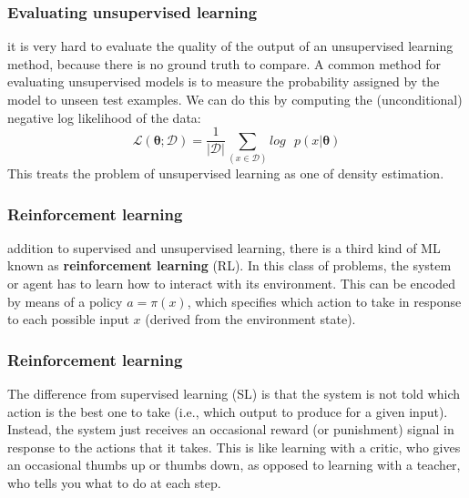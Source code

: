 \documentclass[spanish]{beamer}
\begin{document}
\begin{frame}
\frametitle{Evaluating unsupervised learning}
it is very hard to evaluate the quality of the output of
an unsupervised learning method, because there is no ground truth to compare. A common method for evaluating unsupervised models is to measure the probability assigned by the model to unseen test examples. We can do this by computing the (unconditional) negative log likelihood of the data: 
\begin{equation*}
\mathcal{L}(\mathbf{\theta}; \mathcal{D})= \frac{1}{\vert \mathcal{D} \vert } \sum_{(x\in \mathcal{D} ) }log\text{ } p(x\vert \mathbf{\theta}) 
\end{equation*}
This treats the problem of unsupervised learning as one of density estimation.                                                                                

\end{frame}
\begin{frame}
\frametitle{Reinforcement learning}
addition to supervised and unsupervised learning, there is a third kind of ML known as \textbf{reinforcement learning} (RL). In this class of problems, the system or agent has to learn how to interact with its environment. This can be encoded by means of a policy $a =\pi(x)$, which specifies which action to take in response to each possible input $x$ (derived from the environment state).


\end{frame}
\begin{frame}
\frametitle{Reinforcement learning}
The difference from supervised learning (SL) is that the system is not told which action is the
best one to take (i.e., which output to produce for a given input). Instead, the system just receives
an occasional reward (or punishment) signal in response to the actions that it takes. This is like
learning with a critic, who gives an occasional thumbs up or thumbs down, as opposed to learning
with a teacher, who tells you what to do at each step. 

\end{frame}
\end{document}
